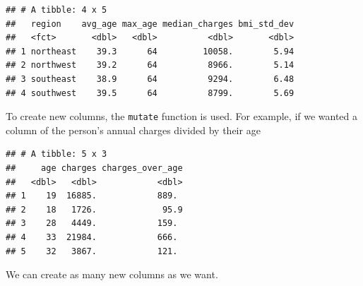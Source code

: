 \documentclass[openany]{book}
\newenvironment{Shaded}{\begin{snugshade}}{\end{snugshade}}
\newcommand{\DataTypeTok}[1]{\textcolor[rgb]{0.13,0.29,0.53}{#1}}
\newcommand{\DecValTok}[1]{\textcolor[rgb]{0.00,0.00,0.81}{#1}}
\newcommand{\KeywordTok}[1]{\textcolor[rgb]{0.13,0.29,0.53}{\textbf{#1}}}
\newcommand{\NormalTok}[1]{#1}
\newcommand{\OperatorTok}[1]{\textcolor[rgb]{0.81,0.36,0.00}{\textbf{#1}}}
\newcommand{\StringTok}[1]{\textcolor[rgb]{0.31,0.60,0.02}{#1}}
\begin{document}
\begin{Shaded}
\end{Shaded}

\begin{verbatim}
## # A tibble: 4 x 5
##   region    avg_age max_age median_charges bmi_std_dev
##   <fct>       <dbl>   <dbl>          <dbl>       <dbl>
## 1 northeast    39.3      64         10058.        5.94
## 2 northwest    39.2      64          8966.        5.14
## 3 southeast    38.9      64          9294.        6.48
## 4 southwest    39.5      64          8799.        5.69
\end{verbatim}

To create new columns, the \texttt{mutate} function is used. For example, if we wanted a column of the person's annual charges divided by their age

\begin{Shaded}
\end{Shaded}

\begin{verbatim}
## # A tibble: 5 x 3
##     age charges charges_over_age
##   <dbl>   <dbl>            <dbl>
## 1    19  16885.            889. 
## 2    18   1726.             95.9
## 3    28   4449.            159. 
## 4    33  21984.            666. 
## 5    32   3867.            121.
\end{verbatim}

We can create as many new columns as we want.
\end{document}
